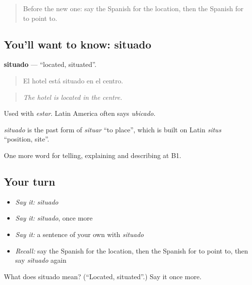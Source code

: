 \label{lesson:ES-C669-situado}



\begin{quote}
Before the new one: say the Spanish for the location, then the Spanish for to point to.
\end{quote}

\subsection*{You'll want to know: situado}
\textbf{situado} — \textquotedblleft{}located, situated\textquotedblright{}.

\begin{quote}
El hotel está situado en el centro.
\end{quote}

\begin{quote}
\emph{The hotel is located in the centre.}
\end{quote}

Used with \emph{estar}. Latin America often says \emph{ubicado}.

\begin{cousinweb}
\emph{situado} is the past form of \emph{situar} \textquotedblleft{}to place\textquotedblright{}, which is built on Latin \emph{situs} \textquotedblleft{}position, site\textquotedblright{}.
\end{cousinweb}

\begin{grammarlens}[title={What you've built}]
One more word for telling, explaining and describing at B1.
\end{grammarlens}

\subsection*{Your turn}
\begin{itemize}
\raggedright
  \item \emph{Say it:} \emph{situado}
  \item \emph{Say it:} \emph{situado}, once more
  \item \emph{Say it:} a sentence of your own with \emph{situado}
  \item \emph{Recall:} say the Spanish for the location, then the Spanish for to point to, then say \emph{situado} again
\end{itemize}

\begin{tcolorbox}[breakable,colback=teal!4,colframe=teal!35!black,title={Before you move on}]
What does situado mean? (\textquotedblleft{}Located, situated\textquotedblright{}.) Say it once more.
\end{tcolorbox}
